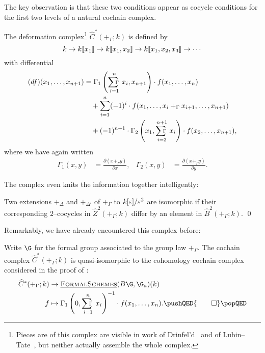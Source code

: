 The key observation is that these two conditions appear as cocycle conditions for the first two levels of a natural cochain complex.
\begin{definition}\label{DeformationComplex}
The deformation complex\footnote{Pieces are of this complex are visible in work of Drinfel'd~\cite[Section 4.A]{Drinfeld} and of Lubin--Tate~\cite{LubinTate}, but neither actually assemble the whole complex.} \(\widehat C^*(+_\Gamma; k)\) is defined by \[k \to k\llbracket{x_1}\rrbracket \to k\llbracket{x_1, x_2}\rrbracket \to k\llbracket{x_1, x_2, x_3}\rrbracket \to \cdots\] with differential
\begin{align*}
(df)(x_1, \ldots, x_{n+1}) & = \Gamma_1\left(\sumGamma_{i=1}^n x_i, x_{n+1} \right) \cdot f(x_1, \ldots, x_n) \\
& \quad + \sum_{i=1}^n (-1)^i \cdot f(x_1, \ldots, x_i +_\Gamma x_{i+1}, \ldots, x_{n+1}) \\
& \quad + (-1)^{n+1} \cdot \Gamma_2\left(x_1, \sumGamma_{i=2}^{n+1} x_i \right) \cdot f(x_2, \ldots, x_{n+1}),
\end{align*}
where we have again written
\begin{align*}
\Gamma_1(x, y) & = \frac{\partial(x +_\Gamma y)}{\partial x}, &
\Gamma_2(x, y) & = \frac{\partial(x +_\Gamma y)}{\partial y}.
\end{align*}
\end{definition}

The complex even knits the information together intelligently:

\begin{corollary}\label{InterpretLTCoboundaries}
Two extensions \(+_\Delta\) and \(+_{\Delta'}\) of \(+_\Gamma\) to \(k[\varepsilon] / \varepsilon^2\) are isomorphic if their corresponding \(2\)--cocycles in \(\widehat{Z}^2(+_\Gamma; k)\) differ by an element in \(\widehat B^2(+_\Gamma; k)\). \qed
\end{corollary}

Remarkably, we have already encountered this complex before:

\begin{lemma}\label{LazarevComparisonOfCplxes}
Write \(\G\) for the formal group associated to the group law \(+_\Gamma\).  The cochain complex \(\widehat C^*(+_\Gamma; k)\) is quasi-isomorphic to the cohomology cochain complex considered in the proof of :
\begin{align*}
\widehat C^*(+_\Gamma; k) & \to \InternalHom{FormalSchemes}(B\G, \G_a)(k) \\
f & \mapsto \Gamma_1\left(0, \sumGamma_{i=1}^n x_i \right)^{-1} \cdot f(x_1, \ldots, x_n). \pushQED{\qed}\qedhere\popQED
\end{align*}
\end{lemma}

